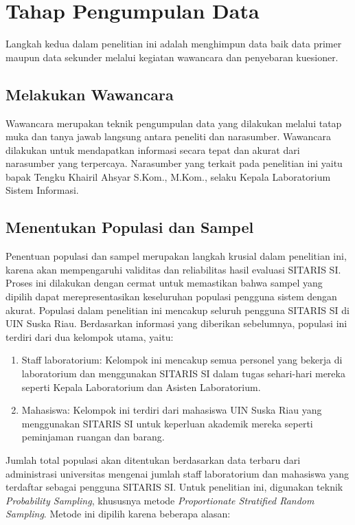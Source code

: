 \section{Tahap Pengumpulan Data}
Langkah kedua dalam penelitian ini adalah menghimpun data baik data primer maupun data sekunder melalui kegiatan wawancara dan penyebaran kuesioner.

\subsection{Melakukan Wawancara}
Wawancara merupakan teknik pengumpulan data yang dilakukan melalui tatap muka dan tanya jawab langsung antara peneliti dan narasumber. Wawancara dilakukan untuk mendapatkan informasi secara tepat dan akurat dari narasumber yang terpercaya. Narasumber yang terkait pada penelitian ini yaitu bapak Tengku Khairil Ahsyar S.Kom., M.Kom., selaku Kepala Laboratorium Sistem Informasi.

\subsection{Menentukan Populasi dan Sampel}
Penentuan populasi dan sampel merupakan langkah krusial dalam penelitian ini, karena akan mempengaruhi validitas dan reliabilitas hasil evaluasi SITARIS SI. Proses ini dilakukan dengan cermat untuk memastikan bahwa sampel yang dipilih dapat merepresentasikan keseluruhan populasi pengguna sistem dengan akurat. Populasi dalam penelitian ini mencakup seluruh pengguna SITARIS SI di UIN Suska Riau. Berdasarkan informasi yang diberikan sebelumnya, populasi ini terdiri dari dua kelompok utama, yaitu:

\begin{enumerate}
	\item Staff laboratorium: Kelompok ini mencakup semua personel yang bekerja di laboratorium dan menggunakan SITARIS SI dalam tugas sehari-hari mereka seperti Kepala Laboratorium dan Asisten Laboratorium.
	\item Mahasiswa: Kelompok ini terdiri dari mahasiswa UIN Suska Riau yang menggunakan SITARIS SI untuk keperluan akademik mereka seperti peminjaman ruangan dan barang.
\end{enumerate}

Jumlah total populasi akan ditentukan berdasarkan data terbaru dari administrasi universitas mengenai jumlah staff laboratorium dan mahasiswa yang terdaftar sebagai pengguna SITARIS SI. Untuk penelitian ini, digunakan teknik \textit{Probability Sampling}, khususnya metode \textit{Proportionate Stratified Random Sampling}. Metode ini dipilih karena beberapa alasan:

